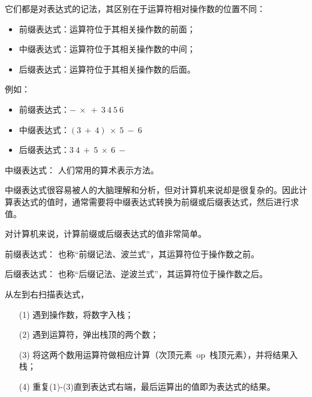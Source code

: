 \begin{frame}

\end{frame}

\begin{frame}
它们都是对表达式的记法，其区别在于运算符相对操作数的位置不同：
\begin{itemize}
\item 前缀表达式：运算符位于其相关操作数的前面；
\item 中缀表达式：运算符位于其相关操作数的中间；
\item 后缀表达式：运算符位于其相关操作数的后面。
\end{itemize}
\end{frame}

\begin{frame}
例如：
\begin{itemize}
\item 前缀表达式：$-~\times~+~3~4~5~6$
\item 中缀表达式：$(3~+~4)~\times ~5 ~- ~6$
\item 后缀表达式：$3~4~+~5~\times~6~-$
\end{itemize}
\end{frame}

\begin{frame}
\textcolor{acolor3}{中缀表达式：}
人们常用的算术表示方法。

中缀表达式很容易被人的大脑理解和分析，但对计算机来说却是很复杂的。因此计算表达式的值时，通常需要将中缀表达式转换为前缀或后缀表达式，然后进行求值。

\textcolor{acolor5}{对计算机来说，计算前缀或后缀表达式的值非常简单。}
\end{frame}

\begin{frame}
\textcolor{acolor3}{前缀表达式：} 也称“前缀记法、波兰式”，其运算符位于操作数之前。\vspace{0.1in}

\textcolor{acolor3}{后缀表达式：} 也称“后缀记法、逆波兰式”，其运算符位于操作数之后。
\end{frame}

\begin{frame}
从左到右扫描表达式，
\begin{itemize}
\item[(1)] 遇到操作数，将数字入栈；
\item[(2)] 遇到运算符，弹出栈顶的两个数；
\item[(3)] 将这两个数用运算符做相应计算（次顶元素~op~栈顶元素），并将结果入栈；
\item[(4)] 重复(1)-(3)直到表达式右端，最后运算出的值即为表达式的结果。
\end{itemize}
\end{frame}

